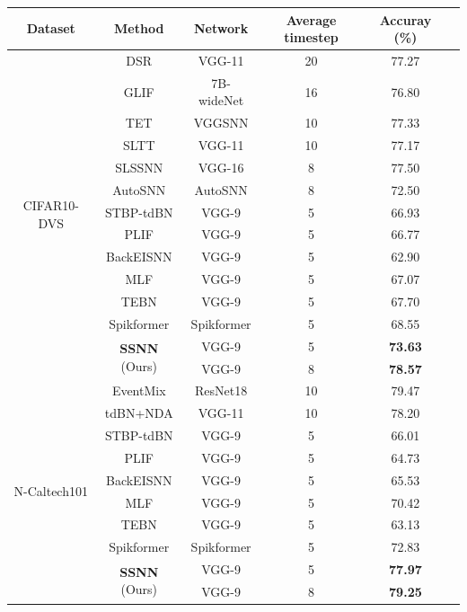 \documentclass[letterpaper]{article} %
\begin{document}
\begin{table}[!tb]
 \centering
 \begin{threeparttable}
 \begin{tabular}{cccccc}
  \toprule
 Dataset & Method & Network & Average timestep & Accuray (\%)\\
  \midrule
  \multirow{14}{*}{CIFAR10-DVS} 
  &DSR \cite{DSR} & VGG-11\tnote{$\dag$} & 20 & 77.27 \\
  &GLIF \cite{GLIF} & 7B-wideNet & 16 & 76.80 \\
  &TET \cite{TET} & VGGSNN & 10 & 77.33 \\
  &SLTT \cite{SLTT} & VGG-11 & 10 & 77.17 \\
  &SLSSNN \cite{SLSSNN} & VGG-16 & 8 & 77.50 \\
  &AutoSNN \cite{AutoSNN} & AutoSNN\tnote{$\dag$} & 8 & 72.50 \\
  \cline{2-5}
  & STBP-tdBN \cite{tdBN_2021} & VGG-9\tnote{*} & 5 & 66.93 \\
  & PLIF \cite{PLIF} & VGG-9\tnote{*} & 5 & 66.77 \\
  & BackEISNN \cite{BackEISNN} & VGG-9\tnote{*} & 5 & 62.90 \\
  & MLF \cite{MLF} & VGG-9\tnote{*} & 5 & 67.07 \\
  & TEBN \cite{TEBN} & VGG-9\tnote{*} & 5 & 67.70 \\
  &Spikformer \cite{Spikformer} & Spikformer\tnote{*$\dag$} & 5 & 68.55 \\
  \cline{2-5}
  &\multirow{2}{*}{\textbf{SSNN} (Ours)}  & VGG-9 & 5 & \textbf{73.63} \\&& VGG-9 & 8 & \textbf{78.57}\\
  \hline
  \multirow{10}{*}{N-Caltech101}
  &EventMix \cite{eventmix} & ResNet18\tnote{$\dag$} & 10 & 79.47 \\
  &tdBN+NDA \cite{NDA} & VGG-11\tnote{$\dag$} & 10 & 78.20 \\
  \cline{2-5}
  &STBP-tdBN \cite{tdBN_2021}  & VGG-9\tnote{*} & 5 & 66.01 \\
  &PLIF \cite{PLIF}  & VGG-9\tnote{*} & 5 & 64.73 \\
  &BackEISNN \cite{BackEISNN} & VGG-9\tnote{*} & 5 & 65.53 \\
  &MLF \cite{MLF} & VGG-9\tnote{*} & 5 & 70.42 \\
  &TEBN \cite{TEBN} & VGG-9\tnote{*} & 5 & 63.13 \\
  &Spikformer \cite{Spikformer} & Spikformer\tnote{*} & 5 & 72.83 \\
  \cline{2-5}
  &\multirow{2}{*}{\textbf{SSNN} (Ours)}  & VGG-9 & 5 & \textbf{77.97} \\&& VGG-9 & 8 & \textbf{79.25}\\

\end{tabular}
\end{threeparttable}
\end{table}
\end{document}
